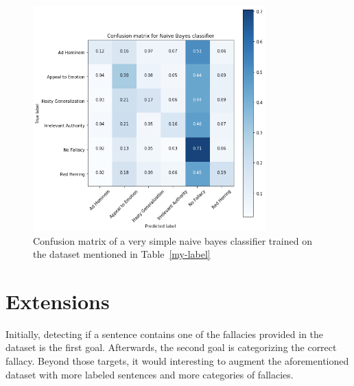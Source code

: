 \documentclass[a4paper]{article}
\begin{document}
\begin{figure}
    \centering
    \caption{Confusion matrix of a very simple naive bayes classifier trained on the dataset mentioned in Table~\ref{my-label}}
    \includegraphics[width=0.8\textwidth]{conf.png}
\end{figure}

\section{Extensions} 
Initially, detecting if a sentence contains one of the fallacies provided in the dataset is the first goal. Afterwards, the second goal is categorizing the correct fallacy. Beyond those targets, it would interesting to augment the aforementioned dataset with more labeled sentences and more categories of fallacies. 
\end{document}
